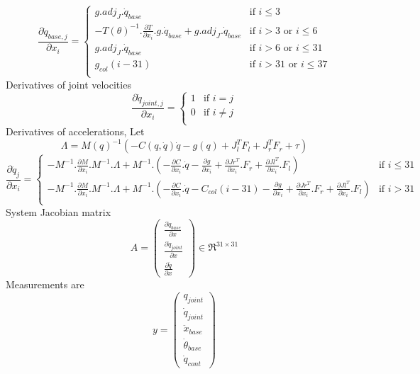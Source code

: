 \documentclass[12pt]{article}
\def\dfdx#1#2{\frac{\partial {#1}}{\partial {#2}}}
\begin{document}
\[
 \dfdx{\dot{q}_{base,j}}{x_{i}} = 
  \begin{cases}
   g.adj_{J}.\dot{q}_{base} & \text{if } i \leq 3 \\
  -T(\theta)^{-1}.\dfdx{T}{x_{i}}.g.\dot{q}_{base} + g.adj_{J}.\dot{q}_{base} & \text{if } i > 3 \text{ or } i \leq 6 \\
   g.adj_{J}.\dot{q}_{base} & \text{if } i > 6 \text{ or } i \leq 31 \\
   g_{col}(i-31) & \text{if } i > 31 \text{ or } i \leq 37 \\
   
  \end{cases}
\]
Derivatives of joint velocities
\[
\dfdx{\dot{q}_{joint,j}}{x_{i}} = 
	\begin{cases}
	1 & \text{if } i = j \\
	0 & \text{if } i \neq j  \\
	\end{cases}
\]
Derivatives of accelerations, Let
$$\Lambda = M(q)^{-1}(-C(q,\dot{q})\dot{q} - g(q) + J_{l}^{T}F_{l} + J_{r}^{T}F_{r} + \tau)$$
\[
\dfdx{\ddot{q}_{j}}{x_{i}} = 
	\begin{cases}
	-M^{-1}.\dfdx{M}{x_{i}}.M^{-1}.\Lambda + M^{-1}.(-\dfdx{C}{x_{i}}.\dot{q} -\dfdx{g}{x_{i}}  + \dfdx{Jr^{T}}{x_{i}}.F_{r} + \dfdx{Jl^{T}}{x_{i}}.F_{l}) & \text{if } i \leq 31 \\
	-M^{-1}.\dfdx{M}{x_{i}}.M^{-1}.\Lambda + M^{-1}.(-\dfdx{C}{x_{i}}.\dot{q}-C_{col}(i-31)  -\dfdx{g}{x_{i}}  + \dfdx{Jr^{T}}{x_{i}}.F_{r} + \dfdx{Jl^{T}}{x_{i}}.F_{l}) & \text{if } i > 31  \\
	\end{cases}
\]
System Jacobian matrix
\begin{equation}
A = 
\begin{pmatrix}
\dfdx{\dot{q}_{base}}{x} \\
\dfdx{\dot{q}_{joint}}{x} \\
\dfdx{\ddot{q}}{x}
\end{pmatrix}
\in \Re^{31 \times 31}
\end{equation}
Measurements are
\begin{equation}
y= 
	\begin{pmatrix}
	q_{joint} \\
	\dot{q}_{joint} \\
	\ddot{x}_{base} \\
	\dot{\theta}_{base}\\
	\dot{q}_{cont}
	\end{pmatrix}
\end{equation}
\end{document}
